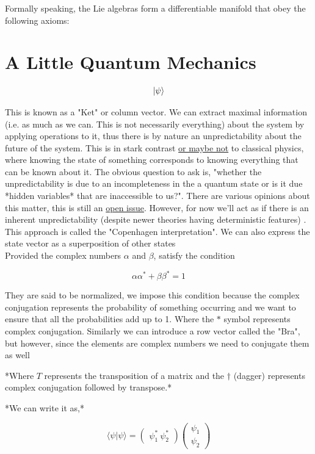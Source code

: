 \documentclass[]{article}
\begin{document}
Formally speaking, the Lie algebras form a differentiable manifold that obey the following axioms:

\section{A Little Quantum Mechanics}
$$\ket{\psi}$$

This is known as a "Ket" or column vector. We can extract maximal information (i.e. as much as we can. This is not necessarily everything) about the system by applying operations to it, thus there is by nature an unpredictability about the future of the system. This is in stark contrast \href{https://arxiv.org/abs/1909.04514}{or maybe not} to classical physics, where knowing the state of something corresponds to knowing everything that can be known about it. The obvious question to ask is, "whether the unpredictability is due to an incompleteness in the a quantum state or is it due *hidden variables* that are inaccessible to us?". There are various opinions about this matter, this is still an \href{https://plato.stanford.edu/entries/qt-issues/#QuesQuanStatReal}{open issue}. However, for now we'll act as if there is an inherent unpredictability (despite newer theories having deterministic features) . This approach is called the "Copenhagen interpretation". We can also express the state vector as a superposition of other states\\


Provided the complex numbers $\alpha$ and $\beta$, satisfy the condition

$$\alpha \alpha^{*} + \beta \beta^{*} = 1 $$

They are said to be normalized, we impose this condition because the complex conjugation represents the probability of something occurring and we want to ensure that all the probabilities add up to 1. Where the $*$ symbol represents complex conjugation. Similarly we can introduce a row vector called the "Bra", but however, since the elements are complex numbers we need to conjugate them as well


*Where $T$ represents the transposition of a matrix and the $\dagger$ (dagger) represents complex conjugation followed by transpose.* 

*We can write it as,*

$$\langle \psi | \psi \rangle = \begin{pmatrix}
\psi^{*}_1 \ \psi^{*}_2
\end{pmatrix}\begin{pmatrix}
\psi_1 \\
\psi_2
\end{pmatrix}$$
\end{document}
